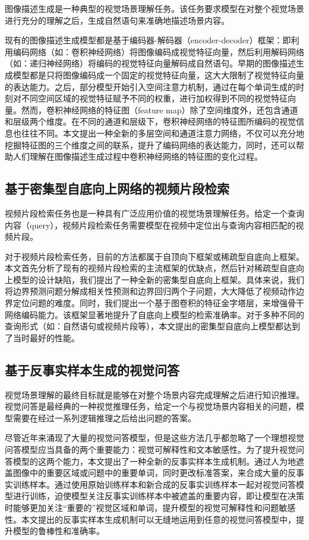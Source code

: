图像描述生成是一种典型的视觉场景理解任务。该任务要求模型在对整个视觉场景进行充分的理解之后，生成自然语句来准确地描述场景内容。

现有的图像描述生成模型都是基于编码器-解码器（encoder-decoder）框架：即利用编码网络（如：卷积神经网络）将图像编码成视觉特征向量，然后利用解码网络（如：递归神经网络）将编码的视觉特征向量解码成自然语句。早期的图像描述生成模型都是只将图像编码成一个固定的视觉特征向量，这大大限制了视觉特征向量的表达能力。之后，部分模型开始引入空间注意力机制，通过在每个单词生成的时刻对不同空间区域的视觉特征赋予不同的权重，进行加权得到不同的视觉特征向量。然而，卷积神经网络的特征图（feature map）除了空间维度外，还包含通道和层级两个维度。在不同的通道和层级下，卷积神经网络的特征图所编码的视觉信息也往往不同。本文提出一种全新的多层空间和通道注意力网络，不仅可以充分地挖掘特征图的三个维度之间的联系，提升了编码网络的表达能力，同时，还可以帮助人们理解在图像描述生成过程中卷积神经网络的特征图的变化过程。


\subsection{基于密集型自底向上网络的视频片段检索}

视频片段检索任务也是一种具有广泛应用价值的视觉场景理解任务。给定一个查询内容（query），视频片段检索任务需要模型在视频中定位出与查询内容相匹配的视频片段。

对于视频片段检索任务，目前的方法都属于自顶向下框架或稀疏型自底向上框架。本文首先分析了现有的视频片段检索的主流框架的优缺点，然后针对稀疏型自底向上模型的设计缺陷，我们提出了一种全新的密集型自底向上框架。具体来说，我们将边界预测问题分解成相关性预测和边界回归两个子问题，大大降低了视频动作边界定位问题的难度。同时，我们提出一个基于图卷积的特征金字塔层，来增强骨干网络编码能力。该框架显著地提升了自底向上模型的检索准确率。对于多种不同的查询形式（如：自然语句或视频片段等），本文提出的密集型自底向上模型都达到了当时最好的性能。


\subsection{基于反事实样本生成的视觉问答}

视觉场景理解的最终目标就是能够在对整个场景内容完成理解之后进行知识推理。视觉问答是最经典的一种视觉推理任务，给定一个与视觉场景内容相关的问题，模型需要在经过一系列逻辑推理之后给出问题的答案。

尽管近年来涌现了大量的视觉问答模型，但是这些方法几乎都忽略了一个理想视觉问答模型应当具备的两个重要能力：视觉可解释性和文本敏感性。为了提升视觉问答模型的这两个能力，本文提出了一种全新的反事实样本生成机制。通过人为地遮盖图像中的重要区域或问题中的重要单词，同时更改标准答案，来合成大量的反事实训练样本。通过使用原始训练样本和新合成的反事实训练样本一起对视觉问答模型进行训练，迫使模型关注反事实训练样本中被遮盖的重要内容，即让模型在决策时能够更加关注“重要的”视觉区域和单词，提升模型的视觉可解释性和问题敏感性。本文提出的反事实样本生成机制可以无缝地运用到任意的视觉问答模型中，提升模型的鲁棒性和准确率。


